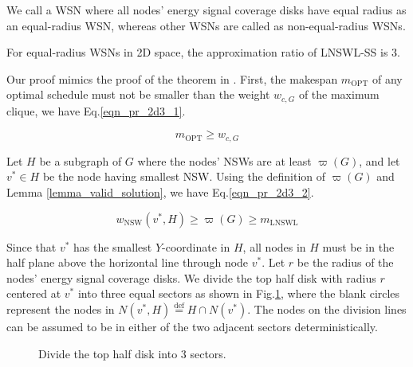 \documentclass[journal,10pt]{IEEEtran}
\begin{document}
We call a WSN where all nodes' energy signal coverage disks have equal radius as an equal-radius WSN, whereas other WSNs are called as non-equal-radius WSNs.

\begin{lemma}
\label{lemma_2d_ratio3}
For equal-radius WSNs in 2D space, the approximation ratio of LNSWL-SS is 3.
\end{lemma}

\begin{IEEEproof}
Our proof mimics the proof of the theorem in \cite{Marathe1995}. First, the makespan $m_\text{OPT}$ of any optimal schedule must not be smaller than the weight $w_{c,G}$ of the maximum clique, we have Eq.\eqref{eqn_pr_2d3_1}.

\begin{equation}
\label{eqn_pr_2d3_1}
m_\text{OPT}{\geq}w_{c,G}
\end{equation}

Let $H$ be a subgraph of $G$ where the nodes' NSWs are at least $\varpi(G)$, and let $v^{*}{\in}H$ be the node having smallest NSW. Using the definition of $\varpi(G)$ and Lemma \ref{lemma_valid_solution}, we have Eq.\eqref{eqn_pr_2d3_2}.

\begin{equation}
\label{eqn_pr_2d3_2}
w_\text{NSW}(v^{*},H){\geq}\varpi(G){\geq}m_\text{LNSWL}
\end{equation}

Since that $v^{*}$ has the smallest $Y$-coordinate in $H$, all nodes in $H$ must be in the half plane above the horizontal line through node $v^{*}$. Let $r$ be the radius of the nodes' energy signal coverage disks. We divide the top half disk with radius $r$ centered at $v^{*}$ into three equal sectors as shown in Fig.\ref{fig_2d3part}, where the blank circles represent the nodes in $N(v^{*},H)\mathop{=}\limits^\text{def}H{\cap}N(v^{*})$. The nodes on the division lines can be assumed to be in either of the two adjacent sectors deterministically.

\begin{figure}[htb]
\caption{Divide the top half disk into 3 sectors.}
\label{fig_2d3part}
\end{figure}


\end{IEEEproof}
\end{document}
